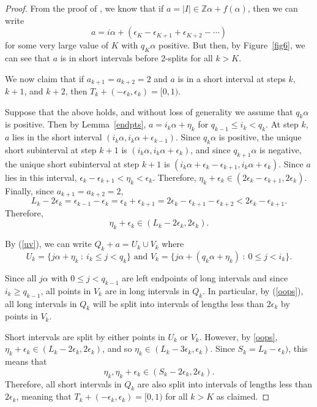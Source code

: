 \documentclass[11pt,reqno]{amsart}
\theoremstyle{definition}
\theoremstyle{plain}
\begin{document}
\begin{proof}

From the proof of , we know that if
$a = |I| \in \mathbb{Z}\alpha + f(\alpha)$, then we can write
\[
a = i \alpha + (\epsilon_K - \epsilon_{K+1} + \epsilon_{K+2} - \cdots)
\]
for some very large value of $K$ with $q_K \alpha$ positive. But then, by Figure~\ref{fig6}, we can see that $a$ is in short intervals before $2$-splits for all $k > K$.

We now claim that if $a_{k+1} = a_{k+2} = 2$ and $a$ is in a short interval at steps $k$, $k+1$, and $k+2$, then 
$T_k + (-\epsilon_k, \epsilon_k) = [0,1)$.

Suppose that the above holds, and without loss of generality we assume that $q_k \alpha$ is positive. Then by Lemma~\ref{endpts}, $a = i_k \alpha + \eta_k$ for $q_{k-1} \leq i_k < q_k$. 
At step $k$, $a$ lies in the short
interval $(i_k \alpha, i_k \alpha + \epsilon_{k-1})$. 
Since $q_k \alpha$ is positive, the unique short subinterval at step $k+1$ is $(i_k \alpha, i_k \alpha + \epsilon_k)$, and since $q_{k+1} \alpha$ is negative, the unique short subinterval at step $k+1$ is 
$(i_k \alpha + \epsilon_k - \epsilon_{k+1}, i_k \alpha + \epsilon_k)$. Since $a$ lies in this interval, $\epsilon_k - \epsilon_{k+1} < \eta_k < \epsilon_k$. Therefore, $\eta_k + \epsilon_k \in (2\epsilon_k - \epsilon_{k+1}, 2\epsilon_k)$. Finally, since
$a_{k+1} = a_{k+2} = 2$,
\[
L_k - 2\epsilon_k = \epsilon_{k-1} - \epsilon_k = \epsilon_k + \epsilon_{k+1} = 2\epsilon_k - \epsilon_{k+1} - \epsilon_{k+2} < 2\epsilon_k - \epsilon_{k+1}.
\]
Therefore, 
\begin{equation}\label{oops}
\eta_k + \epsilon_k \in (L_k - 2\epsilon_k, 2\epsilon_k).
\end{equation}

By (\ref{uv}), we can write $Q_k + a = U_k \cup V_k$ where
\[
U_k = \{j \alpha + \eta_k \ : \ i_k \leq j < q_k\} \textrm{ and } V_k = \{j \alpha + (q_k \alpha + \eta_k) \ : \ 0 \leq j < i_k\}.
\]

Since all $j\alpha$ with $0 \leq j < q_{k-1}$ are left endpoints of long intervals and since $i_k \geq q_{k-1}$, all points in $V_k$ are in long intervals in $Q_k$. In particular, by (\ref{oops}), all long intervals in $Q_k$ will be split into intervals of lengths less than $2\epsilon_k$ by points in $V_k$. 

Short intervals are split by either points in $U_k$ or $V_k$. However, by \ref{oops},
$\eta_k + \epsilon_k \in (L_k - 2\epsilon_k,2\epsilon_k)$, and so
$\eta_k \in (L_k - 3\epsilon_k, \epsilon_k)$. Since $S_k = L_k - \epsilon_k)$, this means that
\[
\eta_k, \eta_k + \epsilon_k \in (S_k - 2\epsilon_k, 2\epsilon_k).
\]
Therefore, all short intervals in $Q_k$ are also split into intervals of lengths less than $2\epsilon_k$, meaning that $T_k + (-\epsilon_k, \epsilon_k) = [0,1)$ for all $k > K$ as claimed.


\end{proof}
\end{document}
